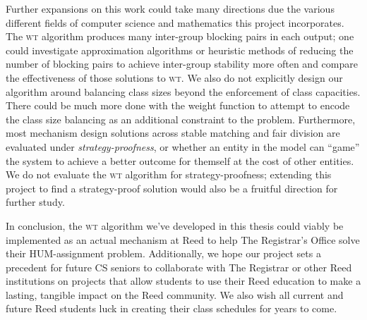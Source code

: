 Further expansions on this work could take many directions due the various different
fields of computer science and mathematics this project incorporates. The
\textsc{wt} algorithm produces many inter-group blocking pairs in each output; one could
investigate approximation algorithms or heuristic methods of reducing the number
of blocking pairs to achieve inter-group stability more often and compare the
effectiveness of those solutions to \textsc{wt}. We also do not explicitly design our
algorithm around balancing class sizes beyond the enforcement of class
capacities. There could be much more done with the weight function to
attempt to encode the class size balancing as an additional constraint to the
problem. Furthermore, most mechanism design solutions across stable matching and
fair division are evaluated under \textit{strategy-proofness}, or whether an entity in
the model can “game” the system to achieve a better outcome for themself at the
cost of other entities. We do not evaluate the \textsc{wt} algorithm for
strategy-proofness; extending this project to find a strategy-proof solution
would also be a fruitful direction for further study.

In conclusion, the \textsc{wt} algorithm we've developed in this thesis could viably be
implemented as an actual mechanism at Reed to help The Registrar's Office solve their
HUM-assignment problem.  Additionally, we hope our project sets a precedent for future CS seniors to
collaborate with The Registrar or other Reed institutions on projects that allow
students to use their Reed education to make a lasting,
tangible impact on the Reed community. We also wish all current and future Reed
students luck in creating their class schedules for years to come.

